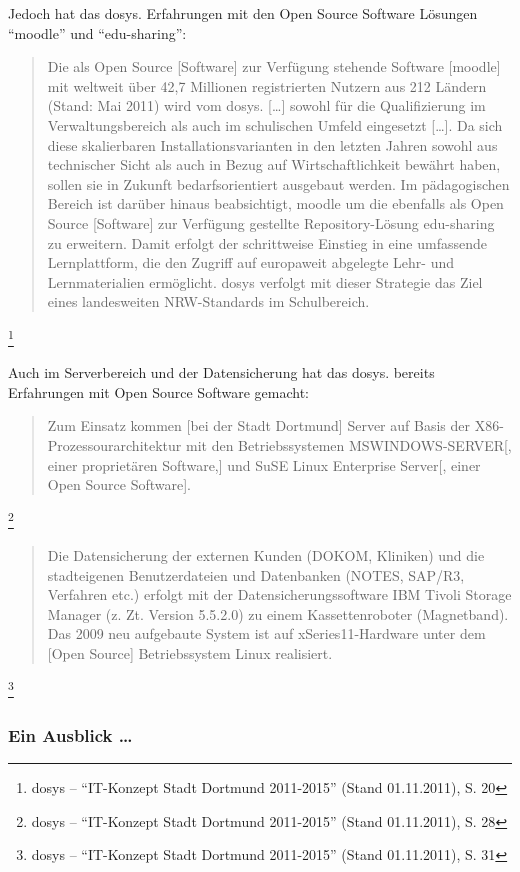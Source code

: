 \documentclass[a4paper]{scrartcl}
\begin{document}
Jedoch hat das dosys. Erfahrungen mit den Open Source Software Lösungen
``moodle'' und ``edu-sharing'': \begin{quote}Die als Open Source [Software] zur
  Verfügung stehende Software [moodle] mit weltweit über 42,7 Millionen
  registrierten Nutzern aus 212 Ländern (Stand: Mai 2011) wird vom
  dosys. [\ldots] sowohl für die Qualifizierung im Verwaltungsbereich als auch
  im schulischen Umfeld eingesetzt [\ldots].  Da sich diese skalierbaren
  Installationsvarianten in den letzten Jahren sowohl aus technischer Sicht als
  auch in Bezug auf Wirtschaftlichkeit bewährt haben, sollen sie in Zukunft
  bedarfsorientiert ausgebaut werden. Im pädagogischen Bereich ist darüber
  hinaus beabsichtigt, moodle um die ebenfalls als Open Source [Software] zur
  Verfügung gestellte Repository-Lösung edu-sharing zu erweitern. Damit erfolgt
  der schrittweise Einstieg in eine umfassende Lernplattform, die den Zugriff
  auf europaweit abgelegte Lehr- und Lernmaterialien ermöglicht. dosys verfolgt
  mit dieser Strategie das Ziel eines landesweiten NRW-Standards im
  Schulbereich.\end{quote}\footnote{dosys -- ``IT-Konzept Stadt Dortmund
  2011-2015'' (Stand 01.11.2011), S. 20}

Auch im Serverbereich und der Datensicherung hat das dosys. bereits Erfahrungen
mit Open Source Software gemacht: \begin{quote}Zum Einsatz kommen [bei der Stadt
  Dortmund] Server auf Basis der X86-Prozessourarchitektur mit den
  Betriebssystemen MSWINDOWS-SERVER[, einer proprietären Software,] und SuSE
  Linux Enterprise Server[, einer Open Source
  Software].\end{quote}\footnote{dosys -- ``IT-Konzept Stadt Dortmund
  2011-2015'' (Stand 01.11.2011), S. 28}

\begin{quote}Die Datensicherung der externen Kunden (DOKOM, Kliniken) und die
  stadteigenen Benutzerdateien und Datenbanken (NOTES, SAP/R3, Verfahren etc.)
  erfolgt mit der Datensicherungssoftware IBM Tivoli Storage Manager
  (z. Zt. Version 5.5.2.0) zu einem Kassettenroboter (Magnetband). Das 2009 neu
  aufgebaute System ist auf xSeries11-Hardware unter dem [Open Source]
  Betriebssystem Linux realisiert.\end{quote}\footnote{dosys -- ``IT-Konzept
  Stadt Dortmund 2011-2015'' (Stand 01.11.2011), S. 31}

\subsubsection{Ein Ausblick \ldots}
\end{document}
